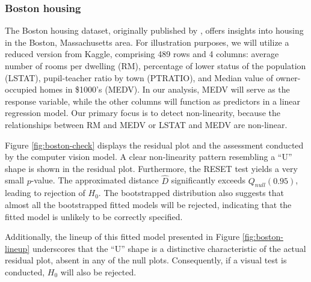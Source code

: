 \documentclass[]{interact}
\theoremstyle{plain}%
\theoremstyle{definition}
\theoremstyle{remark}
\begin{document}
\hypertarget{boston-housing}{%
\subsubsection{Boston housing}\label{boston-housing}}

The Boston housing dataset, originally published by
\citet{harrison1978hedonic}, offers insights into housing in the Boston,
Massachusetts area. For illustration purposes, we will utilize a reduced
version from Kaggle, comprising 489 rows and 4 columns: average number
of rooms per dwelling (RM), percentage of lower status of the population
(LSTAT), pupil-teacher ratio by town (PTRATIO), and Median value of
owner-occupied homes in \$1000's (MEDV). In our analysis, MEDV will
serve as the response variable, while the other columns will function as
predictors in a linear regression model. Our primary focus is to detect
non-linearity, because the relationships between RM and MEDV or LSTAT
and MEDV are non-linear.

Figure \ref{fig:boston-check} displays the residual plot and the
assessment conducted by the computer vision model. A clear non-linearity
pattern resembling a ``U'' shape is shown in the residual plot.
Furthermore, the RESET test yields a very small \(p\)-value. The
approximated distance \(\hat{D}\) significantly exceeds
\(Q_{null}(0.95)\), leading to rejection of \(H_0\). The bootstrapped
distribution also suggests that almost all the bootstrapped fitted
models will be rejected, indicating that the fitted model is unlikely to
be correctly specified.

Additionally, the lineup of this fitted model presented in Figure
\ref{fig:boston-lineup} underscores that the ``U'' shape is a
distinctive characteristic of the actual residual plot, absent in any of
the null plots. Consequently, if a visual test is conducted, \(H_0\)
will also be rejected.
\end{document}
